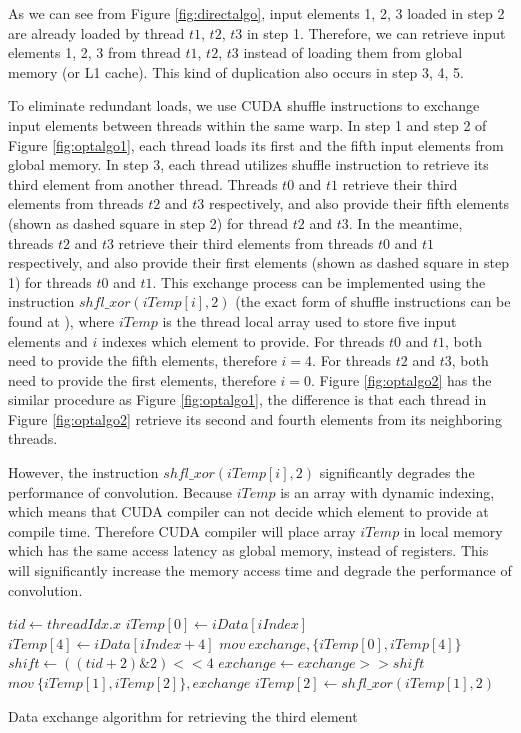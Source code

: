 As we can see from Figure \ref{fig:directalgo}, input elements 1, 2, 3 loaded in step 2 are already loaded by thread $t1$, $t2$, $t3$ in
step 1. Therefore, we can retrieve input elements 1, 2, 3 from thread $t1$, $t2$, $t3$ instead of loading them from global memory (or L1
cache). This kind of duplication also occurs in step 3, 4, 5.

To eliminate redundant loads, we use CUDA shuffle instructions to exchange input elements between threads within the same warp. In step 1
and step 2 of Figure \ref{fig:optalgo1}, each thread loads its first and the fifth input elements from global memory. In step 3, each
thread utilizes shuffle instruction to retrieve its third element from another thread. Threads $t0$ and $t1$ retrieve their third elements
from threads $t2$ and $t3$ respectively, and also provide their fifth elements (shown as dashed square in step 2) for thread $t2$ and $t3$.
In the meantime, threads $t2$ and $t3$ retrieve their third elements from threads $t0$ and $t1$ respectively, and also provide their first
elements (shown as dashed square in step 1) for threads $t0$ and $t1$. This exchange process can be implemented using the instruction
$shfl\_xor(iTemp[i],2)$ (the exact form of shuffle instructions can be found at \cite{CUDAtoolkit}), where $iTemp$ is the thread local
array used to store five input elements and $i$ indexes which element to provide. For threads $t0$ and $t1$, both need to provide the fifth
elements, therefore $i=4$. For threads $t2$ and $t3$, both need to provide the first elements, therefore $i=0$. Figure \ref{fig:optalgo2}
has the similar procedure as Figure \ref{fig:optalgo1}, the difference is that each thread in Figure \ref{fig:optalgo2} retrieve its second
and fourth elements from its neighboring threads.


However, the instruction $shfl\_xor(iTemp[i],2)$ significantly degrades the performance of convolution. Because $iTemp$ is an array with
dynamic indexing, which means that CUDA compiler can not decide which element to provide at compile time. Therefore CUDA compiler will
place array $iTemp$ in local memory which has the same access latency as global memory, instead of registers. This will significantly
increase the memory access time and degrade the performance of convolution.

\begin{algorithm}
	$tid \gets threadIdx.x$\;
	$iTemp[0] \gets iData[iIndex]$\;
	$iTemp[4] \gets iData[iIndex+4]$\;
	$mov\ exchange, \{iTemp[0], iTemp[4]\}$\;
	$shift \gets ((tid+2)\&2)<<4$\;
	$exchange \gets exchange >> shift$\;
	$mov\ \{iTemp[1],iTemp[2]\}, exchange$\;
	$iTemp[2] \gets shfl\_xor(iTemp[1],2)$\;	
	
	\caption{Data exchange algorithm for retrieving the third element}
	\label{algo:basic}
\end{algorithm}


